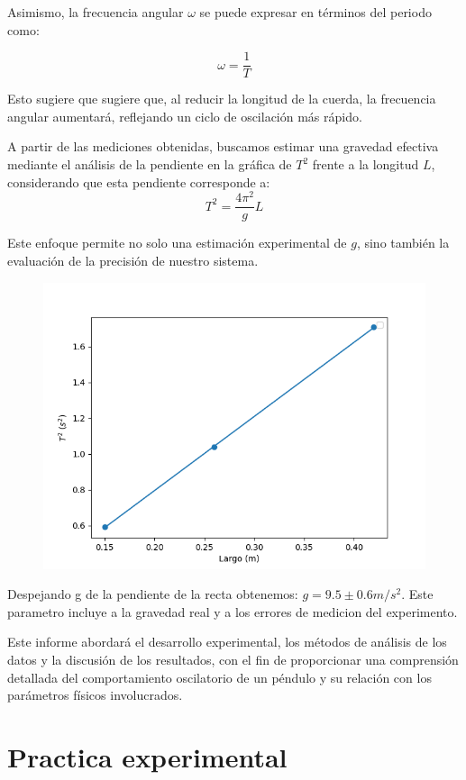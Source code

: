 \documentclass[12pt,a4]{article}
\begin{document}
Asimismo, la frecuencia angular \(\omega\) se puede expresar en términos del periodo como:

\begin{equation}
    \omega = \frac{1}{T}
    \label{eq:omega}
\end{equation}

Esto sugiere que sugiere que, al reducir la longitud de la cuerda, la frecuencia angular aumentará, reflejando un ciclo de oscilación más rápido.

A partir de las mediciones obtenidas, buscamos estimar una gravedad efectiva mediante el análisis de la pendiente en la gráfica de \( T^2 \) frente a la longitud \( L \), considerando que esta pendiente corresponde a:
\begin{equation}
    T^2 = \frac{4 \pi^2}{g} L
    \label{eq:gravedad}
\end{equation}

Este enfoque permite no solo una estimación experimental de \( g \), sino también la evaluación de la precisión de nuestro sistema.

\begin{figure}[H]
    \centering
    \includegraphics[width=0.6\linewidth]{gravedad.png}
    \caption{}   
    \label{fig:gravedad}
\end{figure}

Despejando g de la pendiente de la recta obtenemos: $g = 9.5 \pm 0.6 m/s^2$. Este parametro incluye a la gravedad real y a los errores de medicion del experimento.

Este informe abordará el desarrollo experimental, los métodos de análisis de los datos y la discusión de los resultados, con el fin de proporcionar una comprensión detallada del comportamiento oscilatorio de un péndulo y su relación con los parámetros físicos involucrados.

\section{Practica experimental}
\end{document}
